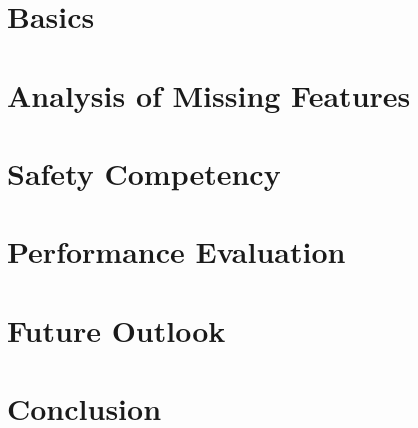 \documentclass[a4paper, 12pt, oneside, BCOR1cm,toc=chapterentrywithdots]{scrbook}
\begin{document}
\chapter{Basics}
\chapter{Analysis of Missing Features}
\chapter{Safety Competency}
\chapter{Performance Evaluation}
\chapter{Future Outlook}
\chapter{Conclusion}
\end{document}
